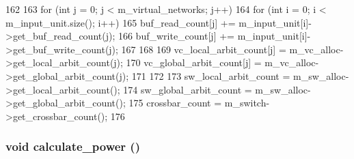 \begin{DoxyCode}
162 {
163     for (int j = 0; j < m_virtual_networks; j++) {
164         for (int i = 0; i < m_input_unit.size(); i++) {
165             buf_read_count[j] += m_input_unit[i]->get_buf_read_count(j);
166             buf_write_count[j] += m_input_unit[i]->get_buf_write_count(j);
167         }
168 
169         vc_local_arbit_count[j]  = m_vc_alloc->get_local_arbit_count(j);
170         vc_global_arbit_count[j] = m_vc_alloc->get_global_arbit_count(j);
171     }
172 
173     sw_local_arbit_count = m_sw_alloc->get_local_arbit_count();
174     sw_global_arbit_count = m_sw_alloc->get_global_arbit_count();
175     crossbar_count = m_switch->get_crossbar_count();
176 }
\end{DoxyCode}
\hypertarget{classRouter__d_afb66ad9c790a20020a752e958f64961a}{
\subsubsection[{calculate\_\-power}]{\setlength{\rightskip}{0pt plus 5cm}void calculate\_\-power ()}}
\label{classRouter__d_afb66ad9c790a20020a752e958f64961a}



